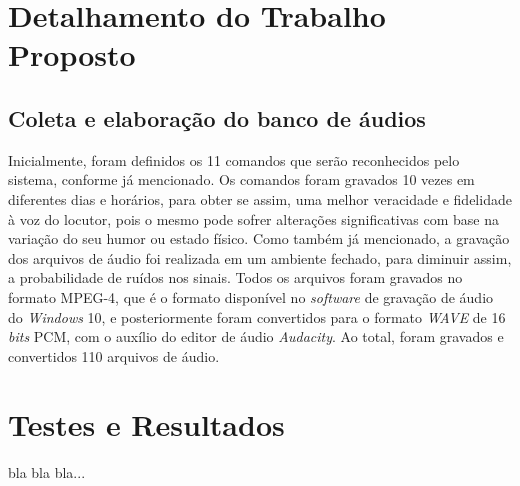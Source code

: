 \documentclass[a4paper,12pt,twoside,openright]{report}
\begin{document}
\chapter{Detalhamento do Trabalho Proposto}
\label{cap3}
\thispagestyle{myheadings}
\vspace*{-0.3cm}
\section{Coleta e elabora{\c c}\~{a}o do banco de \'{a}udios}
\par Inicialmente, foram definidos os 11 comandos que ser\~{a}o reconhecidos pelo sistema, conforme j\'{a} mencionado. Os comandos foram gravados 10 vezes em diferentes dias e hor\'{a}rios, para obter se assim, uma melhor veracidade e fidelidade \`{a} voz do locutor, pois o mesmo pode sofrer altera{\c c}\~{o}es significativas com base na varia{\c c}\~{a}o do seu humor ou estado f\'{i}sico. Como tamb\'{e}m j\'{a} mencionado, a grava{\c c}\~{a}o dos arquivos de \'{a}udio foi realizada em um ambiente fechado, para diminuir assim, a probabilidade de ru\'{i}dos nos sinais. Todos os arquivos foram gravados no formato MPEG-4, que \'{e} o formato dispon\'{i}vel no \textit{software} de grava{\c c}\~{a}o de \'{a}udio do \textit{Windows} 10, e posteriormente foram convertidos para o formato \textit{WAVE} de 16 \textit{bits} PCM, com o aux\'{i}lio do editor de \'{a}udio \textit{Audacity}. Ao total, foram gravados e convertidos 110 arquivos de \'{a}udio.
\chapter{Testes e Resultados}
\label{cap4}
\thispagestyle{myheadings}
bla bla bla...
\end{document}
